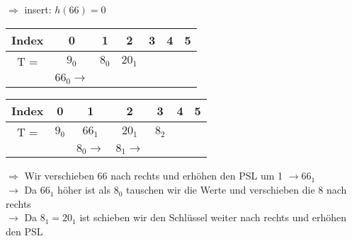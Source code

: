 \newpage
$\Rightarrow$ insert: $h(66)=0$
\begin{multicols}{2}
\begin{center}
\begin{tabular}{|c|c|c|c|c|c|c|}
\hline
Index & 0 & 1 & 2 & 3 & 4 & 5\\
\hline
T = & $9_0$ & $8_0$ & $20_1$ & & &\\
\hline
& $66_0 \rightarrow$ &  & & & &\\
\hline
\end{tabular}
\end{center}


\columnbreak
\begin{center}
\begin{tabular}{|c|c|c|c|c|c|c|}
\hline
Index & 0 & 1 & 2 & 3 & 4 & 5\\
\hline
T = & $9_0$ & $66_1$ & $20_1$ & $8_2$ & &\\
\hline
&  & $8_0 \rightarrow$ & $8_1 \rightarrow$ & & &\\
\hline
\end{tabular}
\end{center}
\end{multicols}
$\Rightarrow$ Wir verschieben $66$ nach rechts und erhöhen den PSL um 1 $\rightarrow 66_1$\\
$\rightarrow$ Da $66_1$ höher ist als $8_0$ tauschen wir die Werte und verschieben die 8 nach rechts\\
$\rightarrow$ Da $8_1 = 20_1$ ist schieben wir den Schlüssel weiter nach rechts und erhöhen den PSL